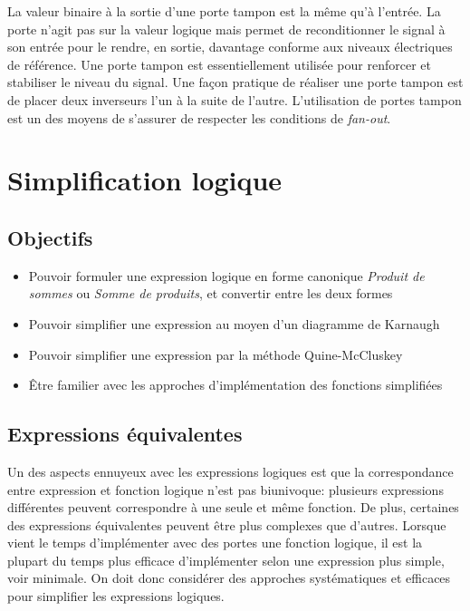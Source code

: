\documentclass[11pt]{article}
\begin{document}
La valeur binaire à la sortie d'une porte tampon est la même qu'à
l'entrée. La porte n'agit pas sur la valeur logique mais permet de
reconditionner le signal à son entrée pour le rendre, en sortie,
davantage conforme aux niveaux électriques de référence. Une porte
tampon est essentiellement utilisée pour renforcer et stabiliser le
niveau du signal. Une façon pratique de réaliser une porte tampon est
de placer deux inverseurs l'un à la suite de l'autre. L'utilisation de
portes tampon est un des moyens de s'assurer de respecter les
conditions de \emph{fan-out}.


\section{Simplification logique}
\label{sec:org8ce9dfc}


\subsection{Objectifs}
\label{sec:org27d1855}
\begin{itemize}
\item Pouvoir formuler une expression logique en forme canonique \emph{Produit
de sommes} ou \emph{Somme de produits}, et convertir entre les deux formes
\item Pouvoir simplifier une expression au moyen d'un diagramme de
Karnaugh
\item Pouvoir simplifier une expression par la méthode Quine-McCluskey
\item Être familier avec les approches d'implémentation des fonctions
simplifiées
\end{itemize}


\subsection{Expressions équivalentes}
\label{sec:org9d268ae}

Un des aspects ennuyeux avec les expressions logiques est que la
correspondance entre expression et fonction logique n'est pas
biunivoque: plusieurs expressions différentes peuvent correspondre à
une seule et même fonction. De plus, certaines des expressions
équivalentes peuvent être plus complexes que d'autres. Lorsque vient
le temps d'implémenter avec des portes une fonction logique, il est la
plupart du temps plus efficace d'implémenter selon une expression plus
simple, voir minimale. On doit donc considérer des approches
systématiques et efficaces pour simplifier les expressions logiques.
\end{document}
